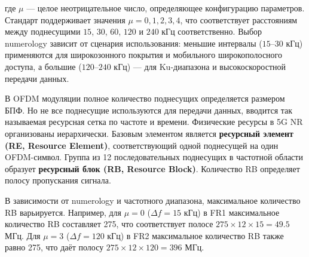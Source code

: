 \noindent где $\mu$ — целое неотрицательное число, определяющее конфигурацию параметров. 
Стандарт поддерживает значения $\mu = 0, 1, 2, 3, 4$, что соответствует расстояниям между 
поднесущими $15$, $30$, $60$, $120$ и $240$ кГц соответственно. 
Выбор numerology зависит от сценария использования: меньшие интервалы ($15$–$30$ кГц) 
применяются для широкозонного покрытия и мобильного широкополосного доступа, 
а большие ($120$–$240$ кГц) — для Ku-диапазона и высокоскоростной передачи данных.


В OFDM модуляции полное количество поднесущих определяется размером БПФ. Но не все поднесущие используются для передачи данных, 
вводится так называемая ресурсная сетка по частоте и времени.
Физические ресурсы в 5G NR организованы иерархически. Базовым элементом является \textbf{ресурсный элемент (RE, Resource Element)},
соответствующий одной поднесущей на один OFDM-символ. Группа из 12 последовательных поднесущих в частотной области образует \textbf{ресурсный блок (RB, Resource Block)}.
Количество RB определяет полосу пропускания сигнала.

В зависимости от numerology и частотного диапазона, максимальное количество RB варьируется. 
Например, для $\mu = 0$ ($\Delta f = 15$ кГц) в FR1 максимальное количество RB составляет 275, 
что соответствует полосе $275 \times 12 \times 15 = 49.5$ МГц. Для $\mu = 3$ ($\Delta f = 120$ кГц) 
в FR2 максимальное количество RB также равно 275, что даёт полосу $275 \times 12 \times 120 = 396$ МГц.


